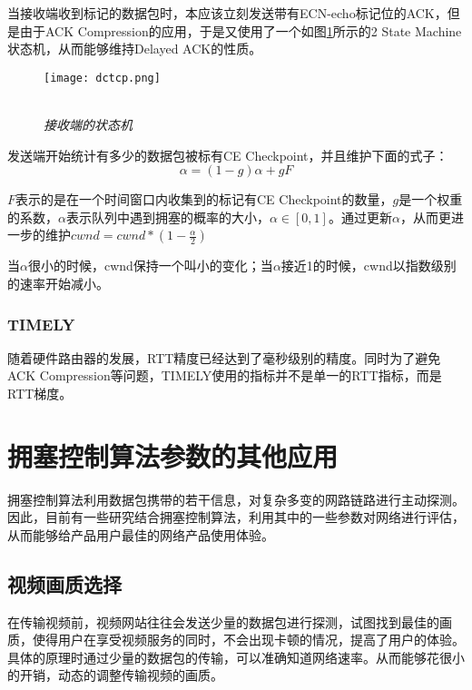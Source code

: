 \documentclass[a4paper, 12pt, UTF8]{ctexart}
\begin{document}
\par 当接收端收到标记的数据包时，本应该立刻发送带有ECN-echo标记位的ACK，但是由于ACK Compression的应用，于是又使用了一个如图\ref{fig:dctcp sm algorithm}所示的2 State Machine状态机，从而能够维持Delayed ACK的性质。

\begin{figure}[H]
	\centering \texttt{[image: dctcp.png]}
	\\ \hspace*{\fill} \\
	\caption{\em 接收端的状态机}
	\label{fig:dctcp sm algorithm}
\end{figure}

\par 发送端开始统计有多少的数据包被标有CE Checkpoint，并且维护下面的式子：
$$
\alpha = (1-g)\alpha+gF
$$
\par $F$表示的是在一个时间窗口内收集到的标记有CE Checkpoint的数量，$g$是一个权重的系数，$\alpha$表示队列中遇到拥塞的概率的大小，$\alpha \in [0, 1]$。通过更新$\alpha$，从而更进一步的维护$cwnd = cwnd*(1-\frac{\alpha}{2})$

\par 当$\alpha$很小的时候，cwnd保持一个叫小的变化；当$\alpha$接近1的时候，cwnd以指数级别的速率开始减小。

\subsubsection{TIMELY}
\par 随着硬件路由器的发展，RTT精度已经达到了毫秒级别的精度。同时为了避免ACK Compression等问题，TIMELY\cite{DBLP:conf/sigcomm/MittalLDBWGVWWZ15}使用的指标并不是单一的RTT指标，而是RTT梯度。

\clearpage

\section{拥塞控制算法参数的其他应用}
\par 拥塞控制算法利用数据包携带的若干信息，对复杂多变的网路链路进行主动探测。因此，目前有一些研究结合拥塞控制算法，利用其中的一些参数对网络进行评估，从而能够给产品用户最佳的网络产品使用体验。

\subsection{视频画质选择}
\par 在传输视频前，视频网站往往会发送少量的数据包进行探测，试图找到最佳的画质\cite{DBLP:conf/nsdi/YanAZFHZLW20}，使得用户在享受视频服务的同时，不会出现卡顿的情况，提高了用户的体验。具体的原理时通过少量的数据包的传输，可以准确知道网络速率。从而能够花很小的开销，动态的调整传输视频的画质。
\end{document}
